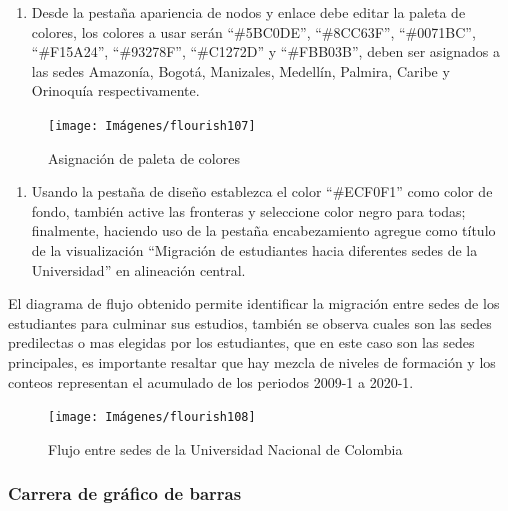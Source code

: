 \documentclass[
]{book}
\providecommand{\tightlist}{%
  \setlength{\itemsep}{0pt}\setlength{\parskip}{0pt}}
\begin{document}
\begin{enumerate}
\def\labelenumi{\arabic{enumi}.}
\setcounter{enumi}{3}
\tightlist
\item
  Desde la pestaña apariencia de nodos y enlace debe editar la paleta de colores, los colores a usar serán ``\#5BC0DE'', ``\#8CC63F'', ``\#0071BC'', ``\#F15A24'', ``\#93278F'', ``\#C1272D'' y ``\#FBB03B'', deben ser asignados a las sedes Amazonía, Bogotá, Manizales, Medellín, Palmira, Caribe y Orinoquía respectivamente.
\end{enumerate}

\begin{figure}

{\centering \texttt{[image: Imágenes/flourish107]} 

}

\caption{Asignación de paleta de colores}\label{fig:paso4sankeyflourish-fig}
\end{figure}

\begin{enumerate}
\def\labelenumi{\arabic{enumi}.}
\setcounter{enumi}{4}
\tightlist
\item
  Usando la pestaña de diseño establezca el color ``\#ECF0F1'' como color de fondo, también active las fronteras y seleccione color negro para todas; finalmente, haciendo uso de la pestaña encabezamiento agregue como título de la visualización ``Migración de estudiantes hacia diferentes sedes de la Universidad'' en alineación central.
\end{enumerate}

El diagrama de flujo obtenido permite identificar la migración entre sedes de los estudiantes para culminar sus estudios, también se observa cuales son las sedes predilectas o mas elegidas por los estudiantes, que en este caso son las sedes principales, es importante resaltar que hay mezcla de niveles de formación y los conteos representan el acumulado de los periodos 2009-1 a 2020-1.

\begin{figure}

{\centering \texttt{[image: Imágenes/flourish108]} 

}

\caption{Flujo entre sedes de la Universidad Nacional de Colombia}\label{fig:finalsankeyflourish-fig}
\end{figure}

\hypertarget{carrerabarrasflourish}{%
\subsubsection{Carrera de gráfico de barras}\label{carrerabarrasflourish}}
\end{document}

